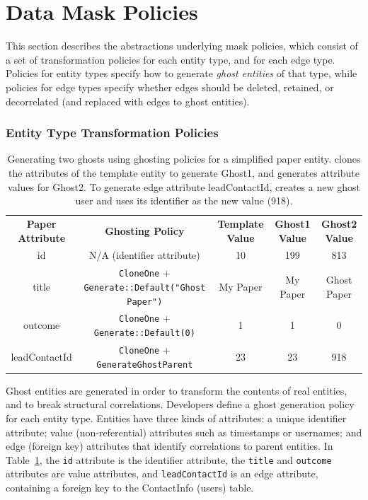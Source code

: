 \section{Data Mask Policies}
\label{sec:policies}

This section describes the abstractions underlying mask policies, which consist of a set of
transformation policies for each entity type, and for each edge type.
Policies for entity types specify how to generate \emph{ghost entities} of that type, while policies
for edge types specify whether edges should be deleted, retained, or decorrelated (and replaced with edges to ghost entities).

\subsubsection{Entity Type Transformation Policies}
\label{sec:ghosting}

\begin{table}[t!]
    \centering
    \footnotesize
\begin{tabular}{@{}ccccc@{}}
\textbf{Paper Attribute} & \textbf{Ghosting Policy} & \textbf{Template Value} & \textbf{Ghost1 Value} & \textbf{Ghost2 Value} 
  \\ \cmidrule(r){1-5}
    {id} & N/A (identifier attribute) & 10 & 199 & 813 \\
{title} & \texttt{CloneOne} + \texttt{Generate::Default("Ghost Paper")} & My Paper & My
    Paper & Ghost Paper \\
{outcome} & \texttt{CloneOne} + \texttt{Generate::Default(0)} & 1 & 1 & 0 \\
{leadContactId} & \texttt{CloneOne} + \texttt{GenerateGhostParent} & 23 & 23 & 918 \\
\end{tabular}
    \caption{Generating two ghosts using ghosting policies for a simplified paper entity.
    \sys clones the attributes of the template entity to generate Ghost1, and generates
    attribute values for Ghost2. To generate edge attribute leadContactId, \sys creates a new ghost user and uses its identifier as the new value (918).}
    \label{tab:ghosting}
\end{table}

Ghost entities are generated in order to transform the contents of real entities, and to
break structural correlations. Developers define a ghost generation policy for each entity type.
Entities have three kinds of attributes: a unique identifier attribute; value
(non-referential) attributes such as timestamps or usernames; and edge (foreign key)
attributes that identify correlations to parent entities.  
%
%
In Table~\ref{tab:ghosting}, the \texttt{id} attribute is the identifier attribute, the
\texttt{title} and \texttt{outcome} attributes are value attributes, and \texttt{leadContactId} is
an edge attribute, containing a foreign key to the ContactInfo (users) table. 

